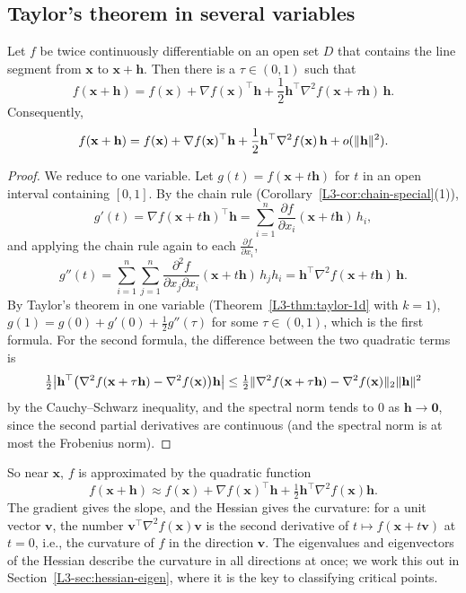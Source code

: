 \subsection{Taylor's theorem in several variables}

\begin{theorem}\label{L3-thm:taylor2}
    Let $f$ be twice continuously differentiable on an open set $D$ that contains the line segment from $\mathbf{x}$ to $\mathbf{x} + \mathbf{h}$. Then there is a $\tau \in (0, 1)$ such that
    \[f(\mathbf{x} + \mathbf{h}) = f(\mathbf{x}) + \nabla f(\mathbf{x})^\top \mathbf{h} + \frac{1}{2}\mathbf{h}^\top \nabla^2 f(\mathbf{x} + \tau\mathbf{h}) \, \mathbf{h}.\]
    Consequently,
    \[f(\mathbf{x} + \mathbf{h}) = f(\mathbf{x}) + \nabla f(\mathbf{x})^\top \mathbf{h} + \frac{1}{2}\mathbf{h}^\top \nabla^2 f(\mathbf{x}) \, \mathbf{h} + o(\lVert \mathbf{h} \rVert^2).\]
\end{theorem}

\begin{proof}
    We reduce to one variable. Let $g(t) = f(\mathbf{x} + t\mathbf{h})$ for $t$ in an open interval containing $[0, 1]$. By the chain rule (Corollary~\ref{L3-cor:chain-special}(1)),
    \[g'(t) = \nabla f(\mathbf{x} + t\mathbf{h})^\top \mathbf{h} = \sum_{i=1}^n \frac{\partial f}{\partial x_i}(\mathbf{x} + t\mathbf{h}) \, h_i,\]
    and applying the chain rule again to each $\frac{\partial f}{\partial x_i}$,
    \[g''(t) = \sum_{i=1}^n \sum_{j=1}^n \frac{\partial^2 f}{\partial x_j \partial x_i}(\mathbf{x} + t\mathbf{h}) \, h_j h_i = \mathbf{h}^\top \nabla^2 f(\mathbf{x} + t\mathbf{h}) \, \mathbf{h}.\]
    By Taylor's theorem in one variable (Theorem~\ref{L3-thm:taylor-1d} with $k = 1$), $g(1) = g(0) + g'(0) + \frac{1}{2}g''(\tau)$ for some $\tau \in (0, 1)$, which is the first formula. For the second formula, the difference between the two quadratic terms is
    \[\tfrac{1}{2}\big|\mathbf{h}^\top \big(\nabla^2 f(\mathbf{x} + \tau\mathbf{h}) - \nabla^2 f(\mathbf{x})\big)\mathbf{h}\big| \leq \tfrac{1}{2}\lVert \nabla^2 f(\mathbf{x} + \tau\mathbf{h}) - \nabla^2 f(\mathbf{x}) \rVert_2 \lVert \mathbf{h} \rVert^2\]
    by the Cauchy--Schwarz inequality, and the spectral norm tends to $0$ as $\mathbf{h} \to \mathbf{0}$, since the second partial derivatives are continuous (and the spectral norm is at most the Frobenius norm).
\end{proof}

So near $\mathbf{x}$, $f$ is approximated by the quadratic function
\[f(\mathbf{x} + \mathbf{h}) \approx f(\mathbf{x}) + \nabla f(\mathbf{x})^\top \mathbf{h} + \tfrac{1}{2}\mathbf{h}^\top \nabla^2 f(\mathbf{x})\mathbf{h}.\]
The gradient gives the slope, and the Hessian gives the curvature: for a unit vector $\mathbf{v}$, the number $\mathbf{v}^\top \nabla^2 f(\mathbf{x})\mathbf{v}$ is the second derivative of $t \mapsto f(\mathbf{x} + t\mathbf{v})$ at $t = 0$, i.e., the curvature of $f$ in the direction $\mathbf{v}$. The eigenvalues and eigenvectors of the Hessian describe the curvature in all directions at once; we work this out in Section~\ref{L3-sec:hessian-eigen}, where it is the key to classifying critical points.

